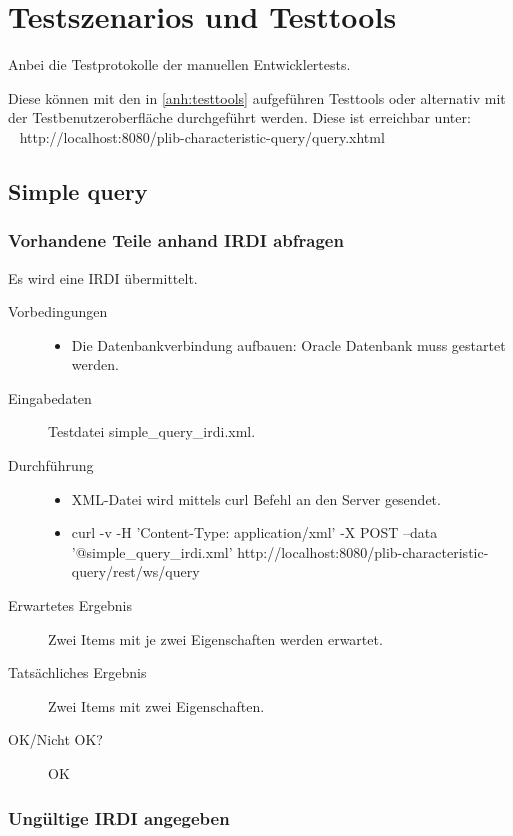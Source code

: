 \chapter{Testszenarios und Testtools} \label{anh:testszenarios}

Anbei die Testprotokolle der manuellen Entwicklertests.

Diese können mit den in \autoref{anh:testtools} aufgeführen Testtools oder alternativ mit der Testbenutzeroberfläche durchgeführt werden. Diese ist erreichbar unter: \\~
http://localhost:8080/plib-characteristic-query/query.xhtml

\section{Simple query}

\subsection{Vorhandene Teile anhand IRDI abfragen}

Es wird eine IRDI übermittelt.

\begin{description}
\item[Vorbedingungen] 
  \begin{itemize}
   \item Die Datenbankverbindung aufbauen: Oracle Datenbank muss gestartet werden.
  \end{itemize}
\item[Eingabedaten] Testdatei simple\_query\_irdi.xml. 
\item[Durchführung]
   \begin{itemize}
   \item XML-Datei wird mittels curl Befehl an den Server gesendet.
   \item curl -v -H 'Content-Type: application/xml' -X POST --data '@simple\_query\_irdi.xml' http://localhost:8080/plib-characteristic-query/rest/ws/query
  \end{itemize}
\item[Erwartetes Ergebnis] Zwei Items mit je zwei Eigenschaften werden erwartet. 
\item[Tatsächliches Ergebnis] Zwei Items mit zwei Eigenschaften.
\item[OK/Nicht OK?] OK
\end{description}


\subsection{Ungültige IRDI angegeben}

